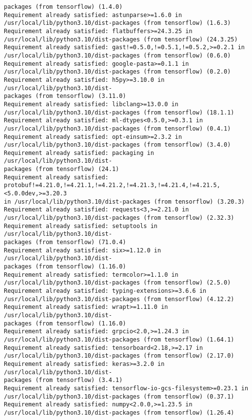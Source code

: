 \documentclass[11pt]{article}
\begin{document}
\begin{Verbatim}[commandchars=\\\{\}]
packages (from tensorflow) (1.4.0)
Requirement already satisfied: astunparse>=1.6.0 in
/usr/local/lib/python3.10/dist-packages (from tensorflow) (1.6.3)
Requirement already satisfied: flatbuffers>=24.3.25 in
/usr/local/lib/python3.10/dist-packages (from tensorflow) (24.3.25)
Requirement already satisfied: gast!=0.5.0,!=0.5.1,!=0.5.2,>=0.2.1 in
/usr/local/lib/python3.10/dist-packages (from tensorflow) (0.6.0)
Requirement already satisfied: google-pasta>=0.1.1 in
/usr/local/lib/python3.10/dist-packages (from tensorflow) (0.2.0)
Requirement already satisfied: h5py>=3.10.0 in /usr/local/lib/python3.10/dist-
packages (from tensorflow) (3.11.0)
Requirement already satisfied: libclang>=13.0.0 in
/usr/local/lib/python3.10/dist-packages (from tensorflow) (18.1.1)
Requirement already satisfied: ml-dtypes<0.5.0,>=0.3.1 in
/usr/local/lib/python3.10/dist-packages (from tensorflow) (0.4.1)
Requirement already satisfied: opt-einsum>=2.3.2 in
/usr/local/lib/python3.10/dist-packages (from tensorflow) (3.4.0)
Requirement already satisfied: packaging in /usr/local/lib/python3.10/dist-
packages (from tensorflow) (24.1)
Requirement already satisfied:
protobuf!=4.21.0,!=4.21.1,!=4.21.2,!=4.21.3,!=4.21.4,!=4.21.5,<5.0.0dev,>=3.20.3
in /usr/local/lib/python3.10/dist-packages (from tensorflow) (3.20.3)
Requirement already satisfied: requests<3,>=2.21.0 in
/usr/local/lib/python3.10/dist-packages (from tensorflow) (2.32.3)
Requirement already satisfied: setuptools in /usr/local/lib/python3.10/dist-
packages (from tensorflow) (71.0.4)
Requirement already satisfied: six>=1.12.0 in /usr/local/lib/python3.10/dist-
packages (from tensorflow) (1.16.0)
Requirement already satisfied: termcolor>=1.1.0 in
/usr/local/lib/python3.10/dist-packages (from tensorflow) (2.5.0)
Requirement already satisfied: typing-extensions>=3.6.6 in
/usr/local/lib/python3.10/dist-packages (from tensorflow) (4.12.2)
Requirement already satisfied: wrapt>=1.11.0 in /usr/local/lib/python3.10/dist-
packages (from tensorflow) (1.16.0)
Requirement already satisfied: grpcio<2.0,>=1.24.3 in
/usr/local/lib/python3.10/dist-packages (from tensorflow) (1.64.1)
Requirement already satisfied: tensorboard<2.18,>=2.17 in
/usr/local/lib/python3.10/dist-packages (from tensorflow) (2.17.0)
Requirement already satisfied: keras>=3.2.0 in /usr/local/lib/python3.10/dist-
packages (from tensorflow) (3.4.1)
Requirement already satisfied: tensorflow-io-gcs-filesystem>=0.23.1 in
/usr/local/lib/python3.10/dist-packages (from tensorflow) (0.37.1)
Requirement already satisfied: numpy<2.0.0,>=1.23.5 in
/usr/local/lib/python3.10/dist-packages (from tensorflow) (1.26.4)

\end{Verbatim}
\end{document}
